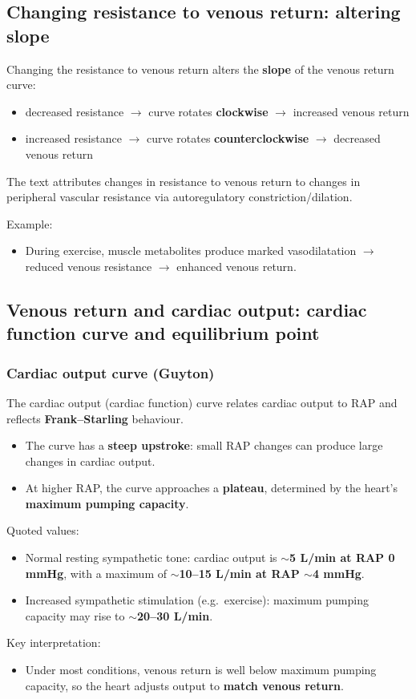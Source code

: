 \documentclass[11pt,a4paper]{article}
\begin{document}
\subsection{Changing resistance to venous return: altering slope}
Changing the resistance to venous return alters the \textbf{slope} of the venous return curve:
\begin{itemize}
\item decreased resistance $\rightarrow$ curve rotates \textbf{clockwise} $\rightarrow$ increased venous return
\item increased resistance $\rightarrow$ curve rotates \textbf{counterclockwise} $\rightarrow$ decreased venous return
\end{itemize}
The text attributes changes in resistance to venous return to changes in peripheral vascular resistance via autoregulatory constriction/dilation.

Example:
\begin{itemize}
\item During exercise, muscle metabolites produce marked vasodilatation $\rightarrow$ reduced venous resistance $\rightarrow$ enhanced venous return.
\end{itemize}

\subsection{Venous return and cardiac output: cardiac function curve and equilibrium point}

\subsubsection{Cardiac output curve (Guyton)}
The cardiac output (cardiac function) curve relates cardiac output to RAP and reflects \textbf{Frank--Starling} behaviour.
\begin{itemize}
\item The curve has a \textbf{steep upstroke}: small RAP changes can produce large changes in cardiac output.
\item At higher RAP, the curve approaches a \textbf{plateau}, determined by the heart's \textbf{maximum pumping capacity}.
\end{itemize}
Quoted values:
\begin{itemize}
\item Normal resting sympathetic tone: cardiac output is \textbf{$\sim$5 L/min at RAP 0 mmHg}, with a maximum of \textbf{$\sim$10--15 L/min at RAP $\sim$4 mmHg}.
\item Increased sympathetic stimulation (e.g.\ exercise): maximum pumping capacity may rise to \textbf{$\sim$20--30 L/min}.
\end{itemize}
Key interpretation:
\begin{itemize}
\item Under most conditions, venous return is well below maximum pumping capacity, so the heart adjusts output to \textbf{match venous return}.
\end{itemize}
\end{document}
